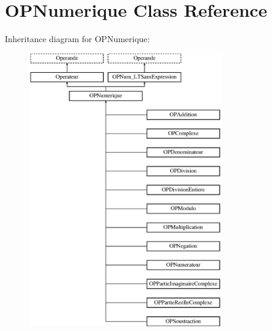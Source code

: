 \hypertarget{class_o_p_numerique}{}\section{O\+P\+Numerique Class Reference}
\label{class_o_p_numerique}
Inheritance diagram for O\+P\+Numerique\+:\begin{figure}[H]
\begin{center}
\leavevmode
\includegraphics[height=12.000000cm]{class_o_p_numerique}
\end{center}
\end{figure}
